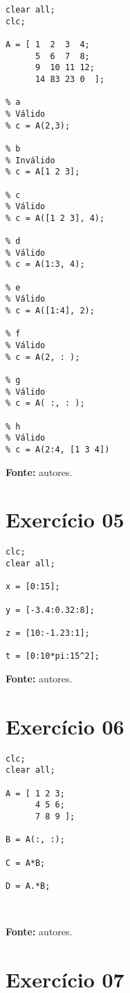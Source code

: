 \documentclass{article}
\newcommand{\leg}[1]{
    \begin{center}
    \textbf{Fonte: } #1.
    \end{center}
    \vspace{0.5cm}
}
\begin{document}
\begin{verbatim}
clear all;
clc;

A = [ 1  2  3  4; 
      5  6  7  8;
      9  10 11 12;
      14 83 23 0  ];

% a
% Válido      
% c = A(2,3);

% b
% Inválido
% c = A[1 2 3];

% c
% Válido      
% c = A([1 2 3], 4);

% d
% Válido      
% c = A(1:3, 4);

% e
% Válido
% c = A([1:4], 2);

% f
% Válido
% c = A(2, : );

% g
% Válido
% c = A( :, : );

% h
% Válido
% c = A(2:4, [1 3 4])
\end{verbatim}
\leg{autores}
\section*{Exercício 05}
\vspace{0.2cm}

\begin{verbatim}
clc;
clear all;

x = [0:15];

y = [-3.4:0.32:8];

z = [10:-1.23:1];

t = [0:10*pi:15^2];
\end{verbatim}
\leg{autores}
\section*{Exercício 06}
\vspace{0.2cm}

\begin{verbatim}
clc;
clear all;

A = [ 1 2 3;
      4 5 6;
      7 8 9 ];
      
B = A(:, :);

C = A*B;

D = A.*B;



\end{verbatim}
\leg{autores}
\section*{Exercício 07}
\vspace{0.2cm}
\end{document}
